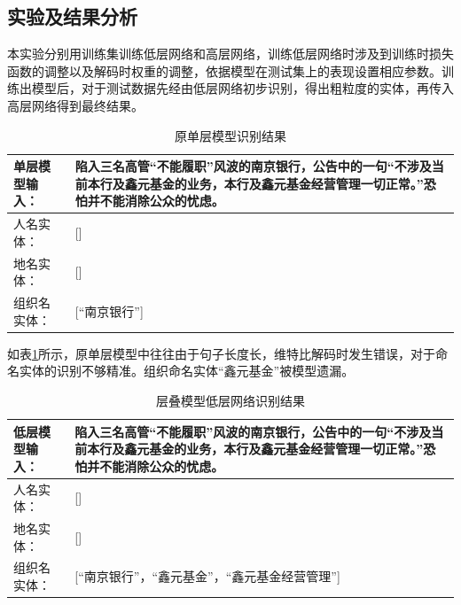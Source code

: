\documentclass[winfonts,master,oneside,nobackinfo]{njuthesis}
\begin{document}
\subsection{实验及结果分析}

本实验分别用训练集训练低层网络和高层网络，训练低层网络时涉及到训练时损失函数的调整以及解码时权重的调整，依据模型在测试集上的表现设置相应参数。训练出模型后，对于测试数据先经由低层网络初步识别，得出粗粒度的实体，再传入高层网络得到最终结果。

\begin{table}[h]
\centering
\begin{tabularx}{0.95\textwidth}{|l|X|}
\hline
单层模型输入： & 陷入三名高管“不能履职”风波的南京银行，公告中的一句“不涉及当前本行及鑫元基金的业务，本行及鑫元基金经营管理一切正常。”恐怕并不能消除公众的忧虑。 \\ \hline
人名实体：             & {[}{]}                                                           \\ \hline
地名实体：             & {[}{]}                                                           \\ \hline
组织名实体：            & {[}“南京银行”{]}                   \\ \hline
\end{tabularx}
\caption{原单层模型识别结果}
\label{one-layer}
\end{table}

如表\ref{one-layer}所示，原单层模型中往往由于句子长度长，维特比解码时发生错误，对于命名实体的识别不够精准。组织命名实体“鑫元基金”被模型遗漏。

\begin{table}[h]
\centering
\begin{tabularx}{0.95\textwidth}{|l|X|}
\hline
低层模型输入： & 陷入三名高管“不能履职”风波的南京银行，公告中的一句“不涉及当前本行及鑫元基金的业务，本行及鑫元基金经营管理一切正常。”恐怕并不能消除公众的忧虑。 \\ \hline
人名实体：             & {[}{]}                                                           \\ \hline
地名实体：             & {[}{]}                                                           \\ \hline
组织名实体：            & {[}“南京银行”，“鑫元基金”，“鑫元基金经营管理”{]}                  \\ \hline
\end{tabularx}
\caption{层叠模型低层网络识别结果}
\label{prob1}
\end{table}
\end{document}
